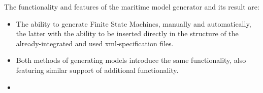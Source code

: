 The functionality and features of the maritime model generator and its result are:
\begin{itemize}
  \item The ability to generate Finite State Machines, manually and automatically, the latter with the ability to be inserted directly in the structure of the already-integrated and used xml-specification files.
  \item Both methods of generating models introduce the same functionality, also featuring similar support of additional functionality.
  \item 
\end{itemize}


